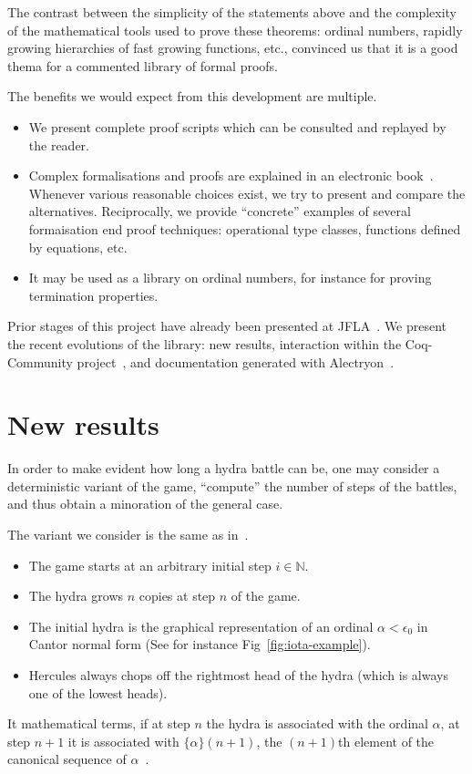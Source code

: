 \documentclass{easychair}
\newcommand{\canonseq}[2]{\mbox{$\{#1\}(#2)$}}
\begin{document}
The contrast between the simplicity of the statements above and the complexity of the mathematical tools used to prove these theorems: ordinal numbers, rapidly growing hierarchies of fast growing functions, etc., convinced us that it is a good thema for a commented library of formal proofs.

The benefits we would expect from this development are multiple.
\begin{itemize}
\item We present complete proof scripts which can be consulted and replayed by the reader.
\item Complex formalisations and proofs are explained in an
  electronic book~\cite{HydraBook}. Whenever various reasonable choices exist, we try to present and compare the alternatives. Reciprocally, we provide ``concrete'' examples of several formaisation end proof techniques: operational type classes, functions defined by  equations, etc.
\item It may be used as a library on ordinal numbers, for instance for proving termination properties.
  \end{itemize}

 Prior stages of this project have already been presented at
 JFLA~\cite{JFLA2018paper}.
We present the recent evolutions of the library: new results, interaction within the Coq-Community project~\cite{CoqCommunity}, and documentation generated with Alectryon~\cite{alectryonpaper, alectryongithub}.

\section{New results}
In order to make evident how long a hydra battle can be,
one may consider a deterministic variant of the game,
``compute'' the number of steps of the battles, and thus obtain a minoration of the general case.

The variant we consider is the same as 
in~\cite{KP82, bauer2008, BauerHydra}. 


 \begin{itemize}
 \item The game starts at an arbitrary initial step $i\in\mathbb{N}$.
   
   \item The hydra grows $n$ copies at step $n$ of the game.
 \item  The initial hydra is the graphical representation of an ordinal  $\alpha<\epsilon_0$  in Cantor normal form (See for instance Fig~\ref{fig:iota-example}). 
 \item Hercules always chops off the rightmost head of the hydra (which is always one of the lowest heads).
 \end{itemize}
 It mathematical terms, if at step $n$ the hydra is associated with the ordinal $\alpha$, at step $n+1$ it is associated with
 $\canonseq{\alpha}{n+1}$, the $(n+1)$th element of the canonical sequence of $\alpha$~\cite{KS81}.
 
\end{document}
